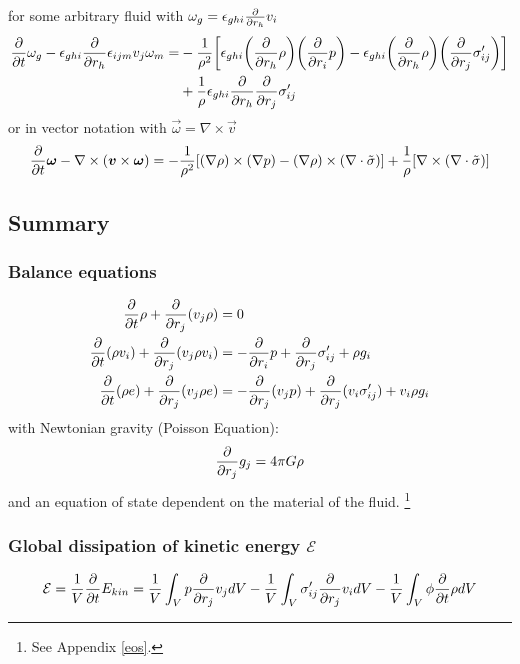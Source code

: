 for some arbitrary
fluid with $\omega_g=\epsilon_{ghi}\frac{\partial}{\partial r_h}v_i$
\begin{align}
\begin{split}
\frac{\partial}{\partial t}\omega_g
-\epsilon_{ghi}\frac{\partial}{\partial r_h} \epsilon_{ijm} v_j \omega_m =
&-\frac{1}{\rho^2}{ \left[ 
\epsilon_{ghi} { \left( \frac{\partial}{\partial r_h}\rho \right) } { \left( \frac{\partial}{\partial r_i}p \right) }
-\epsilon_{ghi} { \left( \frac{\partial}{\partial r_h}\rho \right) } { \left( \frac{\partial}{\partial r_j}\sigma'_{ij} \right) } \right] }\\
&+\frac{1}{\rho}\epsilon_{ghi}\frac{\partial}{\partial r_h}\frac{\partial}{\partial r_j}\sigma'_{ij}
\end{split}
\end{align}
or in vector notation with $\vec{\omega}=\nabla \times \vec{v}$
\begin{align}
\frac{\partial}{\partial t} \boldsymbol{\omega}-\nabla \times (\boldsymbol{v} \times \boldsymbol{\omega}) = 
-\frac{1}{\rho^2}{ \left[ (\nabla \rho) \times(\nabla p)
- (\nabla \rho) \times (\nabla \cdot \tilde{\sigma}) \right] }
+\frac{1}{\rho} { \left[ \nabla \times (\nabla \cdot \tilde{\sigma}) \right] }
\end{align}

\subsection{Summary}
\subsubsection*{Balance equations}
\begin{align}
\frac{\partial}{\partial t}\rho + \frac{\partial}{\partial r_j}(v_j \rho) &= 0 \label{eq:mass}\\
\frac{\partial}{\partial t}(\rho v_i) + \frac{\partial}{\partial r_j}(v_j \rho v_i) &= -\frac{\partial}{\partial r_i}p + \frac{\partial}{\partial r_j}\sigma'_{ij}
+\rho g_i 
\label{eq:mom} \\
\frac{\partial}{\partial t}(\rho e) + \frac{\partial}{\partial r_j}(v_j \rho e) &= -\frac{\partial}{\partial r_j}(v_j p) + \frac{\partial}{\partial r_j}(v_i
\sigma'_{ij}) + v_i \rho g_i
\label{eq:etot}
\end{align}
with Newtonian gravity (Poisson Equation):
\begin{align}
\frac{\partial}{\partial r_j}g_j=4\pi G \rho
\end{align}
and an equation of state dependent on the material of the fluid.
\footnote{See Appendix \ref{eos}.}

\subsubsection*{Global dissipation of kinetic energy $\mathcal{E}$}
\begin{align}
\mathcal{E} = \frac{1}{V} \frac{\partial}{\partial t} E_{kin} = 
\frac{1}{V} \int_V p \frac{\partial}{\partial r_j} v_j dV 
-\frac{1}{V} \int_V \sigma'_{ij}\frac{\partial}{\partial r_j} v_i dV
-\frac{1}{V} \int_V \phi \frac{\partial}{\partial t}\rho dV
\label{eq:diss}
\end{align}


